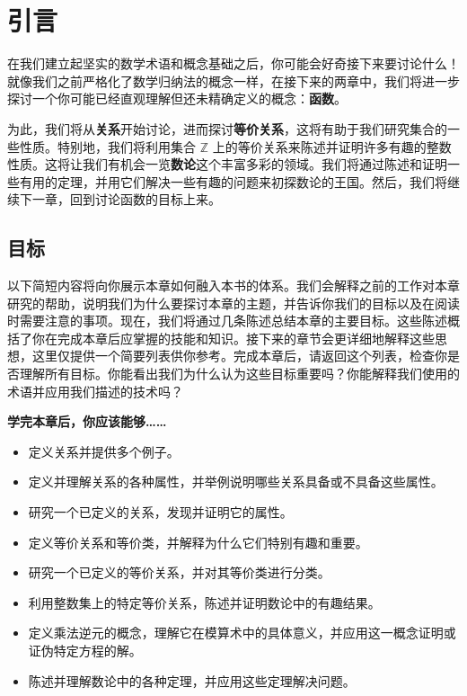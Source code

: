 \section{引言}

在我们建立起坚实的数学术语和概念基础之后，你可能会好奇接下来要讨论什么！就像我们之前严格化了数学归纳法的概念一样，在接下来的两章中，我们将进一步探讨一个你可能已经直观理解但还未精确定义的概念：\textbf{函数}。

为此，我们将从\textbf{关系}开始讨论，进而探讨\textbf{等价关系}，这将有助于我们研究集合的一些性质。特别地，我们将利用集合 $\mathbb{Z}$ 上的等价关系来陈述并证明许多有趣的整数性质。这将让我们有机会一览\textbf{数论}这个丰富多彩的领域。我们将通过陈述和证明一些有用的定理，并用它们解决一些有趣的问题来初探数论的王国。然后，我们将继续下一章，回到讨论函数的目标上来。

\subsection{目标}

以下简短内容将向你展示本章如何融入本书的体系。我们会解释之前的工作对本章研究的帮助，说明我们为什么要探讨本章的主题，并告诉你我们的目标以及在阅读时需要注意的事项。现在，我们将通过几条陈述总结本章的主要目标。这些陈述概括了你在完成本章后应掌握的技能和知识。接下来的章节会更详细地解释这些思想，这里仅提供一个简要列表供你参考。完成本章后，请返回这个列表，检查你是否理解所有目标。你能看出我们为什么认为这些目标重要吗？你能解释我们使用的术语并应用我们描述的技术吗？

\textbf{学完本章后，你应该能够……}

\begin{itemize}
    \item 定义关系并提供多个例子。
    \item 定义并理解关系的各种属性，并举例说明哪些关系具备或不具备这些属性。
    \item 研究一个已定义的关系，发现并证明它的属性。
    \item 定义等价关系和等价类，并解释为什么它们特别有趣和重要。
    \item 研究一个已定义的等价关系，并对其等价类进行分类。
    \item 利用整数集上的特定等价关系，陈述并证明数论中的有趣结果。
    \item 定义乘法逆元的概念，理解它在模算术中的具体意义，并应用这一概念证明或证伪特定方程的解。
    \item 陈述并理解数论中的各种定理，并应用这些定理解决问题。
\end{itemize}

